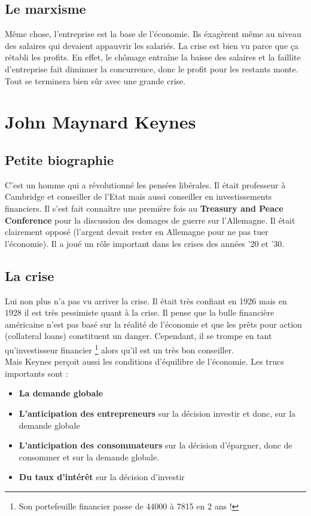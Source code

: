 \subsection{Le marxisme}
Même chose, l'entreprise est la base de l'économie. Ils éxagèrent même au niveau des salaires qui devaient appauvrir les salariés. La crise est bien vu parce que ça rétabli les profits. En effet, le chômage entraîne la baisse des salaires et la faillite d'entreprise fait diminuer la concurrence, donc le profit pour les restants monte. Tout se terminera bien sûr avec une grande crise. 

\section{John Maynard Keynes}
\subsection{Petite biographie}
C'est un homme qui a révolutionné les pensées libérales. Il était professeur à Cambridge et conseiller de l'Etat mais aussi conseiller en investissements financiers. Il s'est fait connaître une première fois au \textbf{Treasury and Peace Conference} pour la discussion des domages de guerre sur l'Allemagne. Il était clairement opposé (l'argent devait rester en Allemagne pour ne pas tuer l'économie). Il a joué un rôle important dans les crises des années '20 et '30. 

\subsection{La crise}
Lui non plus n'a pas vu arriver la crise. Il était très confiant en 1926 mais en 1928 il est très pessimiste quant à la crise. Il pense que la bulle financière américaine n'est pas basé sur la réalité de l'économie et que les prêts pour action (collateral loans) constituent un danger. Cependant, il se trompe en tant qu'investisseur financier \footnote{Son portefeuille financier passe de 44000 à 7815 en 2 ans !} alors qu'il est un très bon conseiller. \\
Mais Keynes perçoit aussi les conditions d'équilibre de l'économie. Les trucs importants sont : 

\begin{itemize}
	\item \textbf{La demande globale}
	\item \textbf{L'anticipation des entrepreneurs} sur la décision investir et donc, sur la demande globale 
	\item \textbf{L'anticipation des consommateurs} sur la décision d'épargner, donc de consommer et sur la demande globale. 
	\item \textbf{Du taux d'intérêt} sur la décision d'investir 
\end{itemize} 

